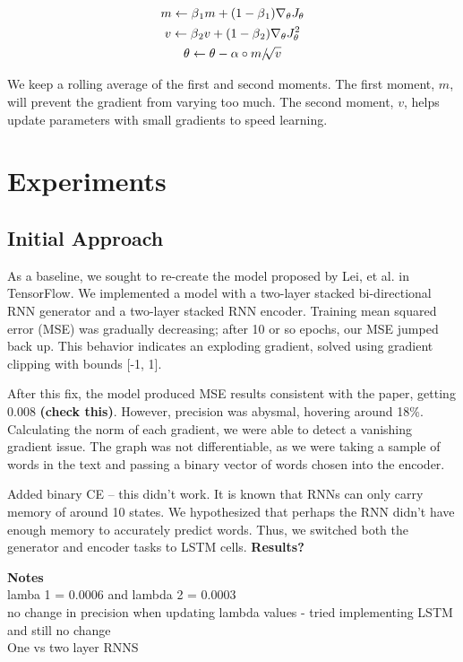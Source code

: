 \documentclass{article} %
\begin{document}
\begin{gather}
m \leftarrow \beta \textsubscript{1} m + (1 - \beta \textsubscript{1}) \nabla_{\theta} J_\theta \\
v \leftarrow \beta \textsubscript{2} v + (1 - \beta \textsubscript{2}) \nabla_{\theta} J_\theta^2\\
\theta \leftarrow \theta - \alpha \circ m / \sqrt[]{v}
\end{gather}

We keep a rolling average of the first and second moments. The first moment, $m$, will prevent the gradient from varying too much. The second moment, $v$, helps update parameters with small gradients to speed learning. 

\section{Experiments}

\subsection{Initial Approach}
As a baseline, we sought to re-create the model proposed by Lei, et al. in TensorFlow. We implemented a model with a two-layer stacked bi-directional RNN generator and a two-layer stacked RNN encoder. Training mean squared error (MSE) was gradually decreasing; after 10 or so epochs, our MSE jumped back up. This behavior indicates an exploding gradient, solved using gradient clipping with bounds [-1, 1]. 

After this fix, the model produced MSE results consistent with the paper, getting 0.008 \textbf{(check this)}. However, precision was abysmal, hovering around 18\%. Calculating the norm of each gradient, we were able to detect a vanishing gradient issue. The graph was not differentiable, as we were taking a sample of words in the text and passing a binary vector of words chosen into the encoder. 

Added binary CE -- this didn't work. It is known that RNNs can only carry memory of around 10 states. We hypothesized that perhaps the RNN didn't have enough memory to accurately predict words. Thus, we switched both the generator and encoder tasks to LSTM cells. \textbf{Results?}




\textbf{Notes} \\
lamba 1 = 0.0006 and lambda 2 = 0.0003 \\
no change in precision when updating lambda values - tried implementing LSTM and still no change\\
One vs two layer RNNS \\
\end{document}
